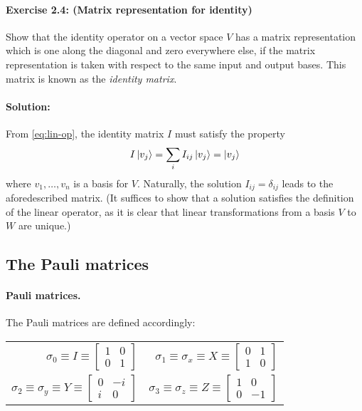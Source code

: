 \documentclass{article}
\begin{document}
\paragraph{\cite{mikeandike} Exercise 2.4: (Matrix representation for identity)} Show that the identity operator on a vector space $V$ has a matrix representation which is one along the diagonal and zero everywhere else, if the matrix representation is taken with respect to the same input and output bases. This matrix is known as the \emph{identity matrix}.

\paragraph{Solution:} From \eqref{eq:lin-op}, the identity matrix $I$ must satisfy the property \begin{equation*}
  I\ket{v_j} = \sum_i I_{ij}\ket{v_j} = \ket{v_j}
\end{equation*} where $v_1, \ldots, v_n$ is a basis for $V$. Naturally, the solution $I_{ij} = \delta_{ij}$ leads to the aforedescribed matrix. (It suffices to show that a solution satisfies the definition of the linear operator, as it is clear that linear transformations from a basis $V$ to $W$ are unique.)

\subsection{The Pauli matrices}

\paragraph{Pauli matrices.} The Pauli matrices are defined accordingly:

\begin{center}
  \begin{tabular}{r r}
    \addlinespace[1em]
    $\sigma_0 \equiv I \equiv \begin{bmatrix}
      1 & 0 \\
      0 & 1
    \end{bmatrix}$ & $\sigma_1 \equiv \sigma_x \equiv X \equiv \begin{bmatrix}
      0 & 1 \\
      1 & 0
    \end{bmatrix}$ \\
    \addlinespace[1em]
    $\sigma_2 \equiv \sigma_y \equiv Y \equiv \begin{bmatrix}
      0 & -i \\
      i & 0
    \end{bmatrix}$ & $\sigma_3 \equiv \sigma_z \equiv Z \equiv \begin{bmatrix}
      1 & 0 \\
      0 & -1
    \end{bmatrix}$
  \end{tabular}
\end{center}
\end{document}
